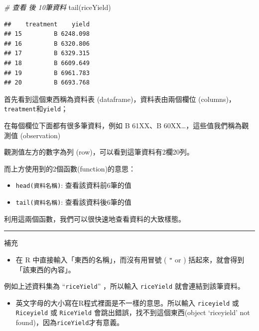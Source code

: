 \documentclass[
]{book}
\newenvironment{Shaded}{\begin{snugshade}}{\end{snugshade}}
\newcommand{\CommentTok}[1]{\textcolor[rgb]{0.56,0.35,0.01}{\textit{#1}}}
\newcommand{\FunctionTok}[1]{\textcolor[rgb]{0.00,0.00,0.00}{#1}}
\newcommand{\NormalTok}[1]{#1}
\providecommand{\tightlist}{%
  \setlength{\itemsep}{0pt}\setlength{\parskip}{0pt}}
\begin{document}
\begin{Shaded}
\begin{Highlighting}[]
\CommentTok{\# 查看 後 10筆資料}
\FunctionTok{tail}\NormalTok{(riceYield)}
\end{Highlighting}
\end{Shaded}

\begin{verbatim}
##    treatment    yield
## 15         B 6248.098
## 16         B 6320.806
## 17         B 6329.315
## 18         B 6609.649
## 19         B 6961.783
## 20         B 6693.768
\end{verbatim}

首先看到這個東西稱為資料表 (dataframe)，資料表由兩個欄位 (columns)，\texttt{treatment}和\texttt{yield}；

在每個欄位下面都有很多筆資料，例如 B 61XX、B 60XX\ldots，這些值我們稱為觀測值 (observation)

觀測值左方的數字為列 (row)，可以看到這筆資料有2欄20列。

而上方使用到的2個函數(function)的意思：

\begin{itemize}
\tightlist
\item
  \texttt{head(資料名稱)}: 查看該資料前6筆的值
\item
  \texttt{tail(資料名稱)}: 查看該資料後6筆的值
\end{itemize}

利用這兩個函數，我們可以很快速地查看資料的大致樣態。

\begin{center}\rule{0.5\linewidth}{0.5pt}\end{center}

補充

\begin{itemize}
\tightlist
\item
  在 R 中直接輸入「東西的名稱」，而沒有用冒號 ( \texttt{"} or \texttt{\textquotesingle{}} ) 括起來，就會得到「該東西的內容」。
\end{itemize}

例如上述資料集為 ``\texttt{riceYield}'' ，所以輸入 \texttt{riceYield} 就會連結到該筆資料。

\begin{itemize}
\tightlist
\item
  英文字母的大小寫在R程式裡面是不一樣的意思。所以輸入 \texttt{riceyield} 或 \texttt{Riceyield} 或 \texttt{RiceYield} 會跳出錯誤，找不到這個東西(object `riceyield' not found)，因為\texttt{riceYield}才有意義。
\end{itemize}
\end{document}
